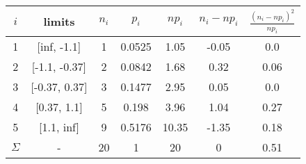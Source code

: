 \begin{tabular}{| c | c | c | c | c | c | c |} \hline
$i$ & limits & $n_i$ & $p_i$ & $np_i$ & $n_i - np_i$ & $\frac{(n_i-np_i)^2}{np_i} $ \\ \hline 
1 & [inf, -1.1] & 1 & 0.0525 & 1.05 & -0.05 & 0.0 \\ \hline 
2 & [-1.1, -0.37] & 2 & 0.0842 & 1.68 & 0.32 & 0.06 \\ \hline 
3 & [-0.37, 0.37] & 3 & 0.1477 & 2.95 & 0.05 & 0.0 \\ \hline 
4 & [0.37, 1.1] & 5 & 0.198 & 3.96 & 1.04 & 0.27 \\ \hline 
5 & [1.1, inf] & 9 & 0.5176 & 10.35 & -1.35 & 0.18 \\ \hline 
$\Sigma$ & - & 20 & 1 & 20 & 0 & 0.51 \\ \hline 
\end{tabular}